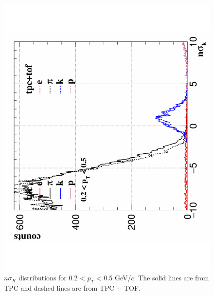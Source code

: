 \begin{figure}[htbp]
\begin{minipage}[htbp]{0.52\linewidth}
\centering
\includegraphics[width=1.0\textwidth,angle=-90]{figure/Run14_D0HFT/tofMatch_Hijing_nSigmaK1.pdf}
\caption{$n\sigma_{K}$ distributions for 0.2 < $p_T$ < 0.5 GeV/$c$. The solid lines are from TPC and dashed lines are from TPC + TOF.\label{fig:tpck1}}
\end{minipage}
\hfill
\begin{minipage}[htbp]{0.52\linewidth}
\centering

\end{minipage}
\end{figure}
